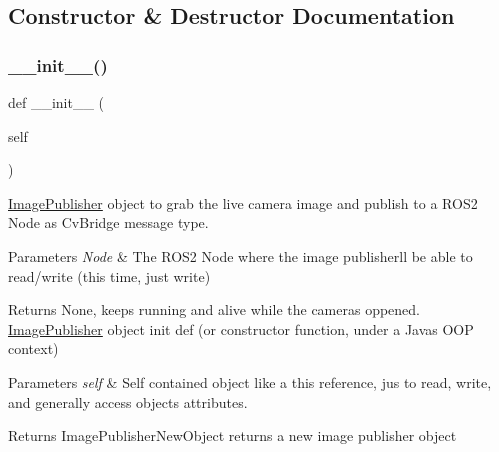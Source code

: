 \subsection{Constructor \& Destructor Documentation}
\mbox{\label{classtoxic__vision_1_1webcam__pub_1_1ImagePublisher_ae64f0875afe3067b97ba370b354b9213}} 
\subsubsection{\texorpdfstring{\+\_\+\+\_\+init\+\_\+\+\_\+()}{\_\_init\_\_()}}
{\footnotesize\ttfamily def \+\_\+\+\_\+init\+\_\+\+\_\+ (\begin{DoxyParamCaption}\item[{}]{self }\end{DoxyParamCaption})}



\mbox{\hyperlink{classtoxic__vision_1_1webcam__pub_1_1ImagePublisher}{Image\+Publisher}} object to grab the live camera image and publish to a R\+O\+S2 Node as Cv\+Bridge message type. 


\begin{DoxyParams}{Parameters}
{\em Node} & The R\+O\+S2 Node where the image publisher\textquotesingle{}ll be able to read/write (this time, just write)\\
\hline
\end{DoxyParams}
\begin{DoxyReturn}{Returns}
None, keeps running and alive while the camera\textquotesingle{}s oppened. \mbox{\hyperlink{classtoxic__vision_1_1webcam__pub_1_1ImagePublisher}{Image\+Publisher}} object init def (or constructor function, under a Java\textquotesingle{}s O\+OP context)
\end{DoxyReturn}

\begin{DoxyParams}{Parameters}
{\em self} & Self contained object like a \textquotesingle{}this\textquotesingle{} reference, jus to read, write, and generally access object\textquotesingle{}s attributes.\\
\hline
\end{DoxyParams}
\begin{DoxyReturn}{Returns}
Image\+Publisher\+New\+Object returns a new image publisher object 
\end{DoxyReturn}

